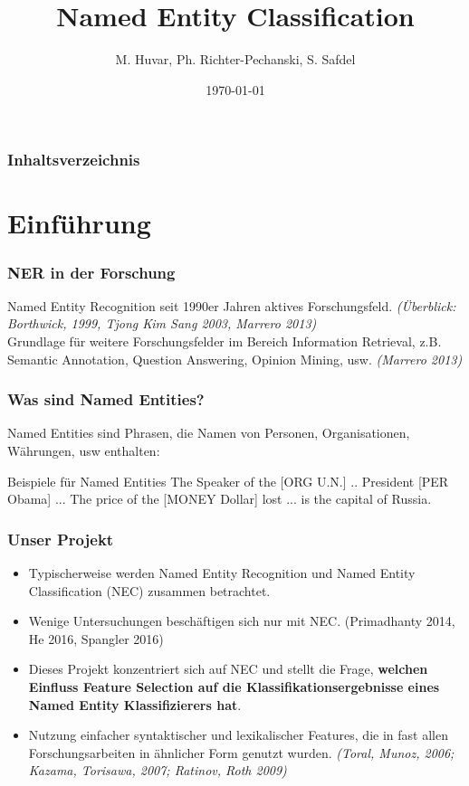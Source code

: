 \documentclass{beamer}
\title{Named Entity Classification}
\author{M. Huvar, Ph. Richter-Pechanski, S. Safdel}
\date{\today}
\begin{document}
\begin{frame}
\titlepage
\end{frame} 

\begin{frame}
\frametitle{Inhaltsverzeichnis}
\tableofcontents
\end{frame} 


\section{Einführung}
\begin{frame}
	\frametitle{NER in der Forschung}
	Named Entity Recognition seit 1990er Jahren aktives Forschungsfeld. \textit{(Überblick: Borthwick, 1999, Tjong Kim Sang 2003, Marrero 2013)}\\
	
	Grundlage für weitere Forschungsfelder im Bereich Information Retrieval, z.B. Semantic Annotation, Question Answering, Opinion Mining, usw. \textit{(Marrero 2013)}
\end{frame}
\begin{frame}
	\frametitle{Was sind Named Entities?}
	Named Entities sind Phrasen, die Namen von Personen, Organisationen, Währungen, usw enthalten:\\
	\begin{exampleblock}{Beispiele für Named Entities}
		The Speaker of the [ORG U.N.] .. \newline 
		President [PER Obama] ... \newline 
		The price of the [MONEY Dollar] lost ...  is the capital of Russia. 
	\end{exampleblock}

\end{frame}
	\begin{frame}
		\frametitle{Unser Projekt}
		\begin{itemize}
			\item <+->Typischerweise werden Named Entity Recognition und Named Entity Classification (NEC) zusammen betrachtet.
			\item <+->Wenige Untersuchungen beschäftigen sich nur mit NEC. (Primadhanty 2014, He 2016, Spangler 2016)
			\item <+->Dieses Projekt konzentriert sich auf NEC und stellt die Frage, \textbf{welchen Einfluss Feature Selection auf die Klassifikationsergebnisse eines Named Entity Klassifizierers hat}.
			\item <+->Nutzung einfacher syntaktischer und lexikalischer Features, die in fast allen Forschungsarbeiten in ähnlicher Form genutzt wurden. \textit{(Toral, Munoz, 2006; Kazama, Torisawa, 2007; Ratinov, Roth 2009)} 
		\end{itemize}	

	\end{frame}
\end{document}

